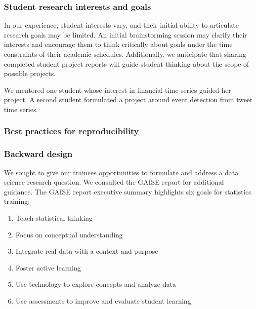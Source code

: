 \documentclass[
]{article}
\providecommand{\tightlist}{%
  \setlength{\itemsep}{0pt}\setlength{\parskip}{0pt}}
\begin{document}
\hypertarget{student-research-interests-and-goals}{%
\subsubsection{Student research interests and
goals}\label{student-research-interests-and-goals}}

In our experience, student interests vary, and their initial ability to
articulate research goals may be limited. An initial brainstorming
session may clarify their interests and encourage them to think
critically about goals under the time constraints of their academic
schedules. Additionally, we anticipate that sharing completed student
project reports will guide student thinking about the scope of possible
projects.

We mentored one student whose interest in financial time series guided
her project. A second student formulated a project around event
detection from tweet time series.

\hypertarget{best-practices-for-reproducibility}{%
\subsubsection{Best practices for
reproducibility}\label{best-practices-for-reproducibility}}

\hypertarget{backward-design}{%
\subsubsection{Backward design}\label{backward-design}}

We sought to give our trainees opportunities to formulate and address a
data science research question. We consulted the GAISE report for
additional guidance. The GAISE report executive summary highlights six
goals for statistics training:

\begin{enumerate}
\def\labelenumi{\arabic{enumi}.}
\tightlist
\item
  Teach statistical thinking
\item
  Focus on conceptual understanding
\item
  Integrate real data with a context and purpose
\item
  Foster active learning
\item
  Use technology to explore concepts and analyze data
\item
  Use assessments to improve and evaluate student learning
\end{enumerate}
\end{document}
